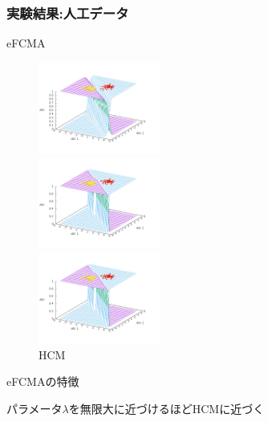 \documentclass[13pt,dvipdfmx]{beamer}
\begin{document}
\begin{frame}\frametitle{実験結果:人工データ}
  \begin{block}{eFCMA}
    \begin{figure}[htbp]
      \begin{minipage}{0.32\hsize}
        \begin{center}
          \includegraphics[width=40mm]{eFCMA-Lambda1.png}
        \end{center}
        \captionsetup{labelformat=empty,labelsep=none}
        \caption{$\lambda=1$}
        \label{fig:one}
      \end{minipage}
      \begin{minipage}{0.32\hsize}
        \begin{center}
          \includegraphics[width=40mm]{eFCMA-Lambda10000.png}
        \end{center}
        \captionsetup{labelformat=empty,labelsep=none}
        \caption{$\lambda=10000$}
        \label{fig:two}
      \end{minipage}
     \begin{minipage}{0.32\hsize}
        \begin{center}
          \includegraphics[width=40mm]{HCM.png}
        \end{center}
        \captionsetup{labelformat=empty,labelsep=none}
        \caption{HCM}
      \label{fig:three}
     \end{minipage}
    \end{figure}
  \end{block}
  \begin{block}{eFCMAの特徴}
    \begin{center}
      パラメータ$\lambda$を無限大に近づけるほどHCMに近づく
    \end{center}
  \end{block}
\end{frame}
\end{document}
